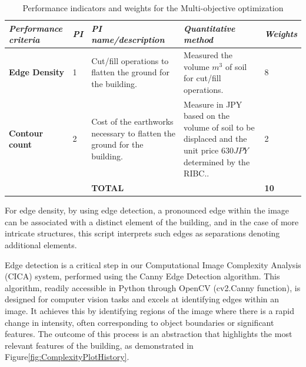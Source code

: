     \begin{table}[htb]
        \centering
        \small
        \caption{Performance indicators and weights for the Multi-objective optimization}
        \label{tab:PerformanceIndicators}
        \begin{tabularx}{\textwidth}{p{3.5cm} p{1cm} X X p{1cm}}
            \toprule
            \textit{Performance   criteria} &
              \textit{PI} &
              \textit{PI   name/description} &
              \textit{Quantitative   method} &
              \textit{Weights} \\ \midrule
            \textbf{Edge Density} &
              1 &
              Cut/fill operations to flatten the ground for the   building. &
              Measured  the volume \(m^3\) of soil for cut/fill   operations. &
              8\\
            \textbf{Contour count} &
              2 &
              Cost of the earthworks necessary to flatten the   ground for the building. &
              Measure in JPY based on the volume of soil to be   displaced and the unit price \(630 JPY\) determined by the RIBC.\cite{RIBC}. &
              2\\ \bottomrule
               &
               &
              \textbf{TOTAL} &
              &
              \textbf{10}\\ \bottomrule
        \end{tabularx}
    \end{table}



For edge density, by using edge detection, a pronounced edge within the image can be associated with a distinct element of the building, and in the case of more intricate structures, this script interprets such edges as separations denoting additional elements.

Edge detection is a critical step in our Computational Image Complexity Analysis (CICA) system, performed using the Canny Edge Detection algorithm\cite{EdgeOpenCV2023}.
This algorithm, readily accessible in Python through OpenCV (cv2.Canny function), is designed for computer vision tasks and excels at identifying edges within an image.
It achieves this by identifying regions of the image where there is a rapid change in intensity, often corresponding to object boundaries or significant features.
The outcome of this process is an abstraction that highlights the most relevant features of the building, as demonstrated in Figure\ref{fig:ComplexityPlotHistory}.

